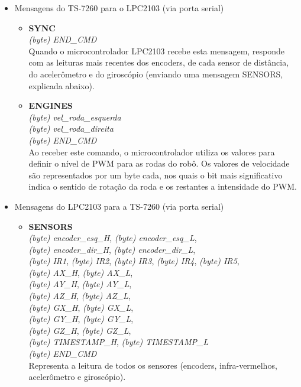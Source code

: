 \begin{itemize}
  \item Mensagens do TS-7260 para o LPC2103 (via porta serial)
  
	\begin{itemize}
		
	  \item \textbf{SYNC}\\
	  \textit{(byte) END\_CMD}\\
	  Quando o microcontrolador LPC2103 recebe esta mensagem, responde com as leituras mais recentes dos encoders, de cada sensor de distância, do acelerômetro e do giroscópio (enviando uma mensagem SENSORS, explicada abaixo).
	  
	  \item \textbf{ENGINES}\\
	  \textit{(byte) vel\_roda\_esquerda}\\
	  \textit{(byte) vel\_roda\_direita}\\
	  \textit{(byte) END\_CMD}\\
	  Ao receber este comando, o microcontrolador utiliza os valores para definir o nível de PWM para as rodas do robô. Os valores de velocidade são representados por um byte cada, nos quais o bit mais significativo indica o sentido de rotação da roda e os restantes a intensidade do PWM.
	  
	  \end{itemize}
	  
	  \item Mensagens do LPC2103 para a TS-7260 (via porta serial)
	  
	  \begin{itemize}
	  
	  \item \textbf{SENSORS}\\
	  \textit{(byte) encoder\_esq\_H}, \textit{(byte) encoder\_esq\_L},\\
	  \textit{(byte) encoder\_dir\_H}, \textit{(byte) encoder\_dir\_L},\\
	  \textit{(byte) IR1}, \textit{(byte) IR2}, \textit{(byte) IR3}, \textit{(byte) IR4}, \textit{(byte) IR5},\\
	  \textit{(byte) AX\_H}, \textit{(byte) AX\_L},\\
	  \textit{(byte) AY\_H}, \textit{(byte) AY\_L},\\
	  \textit{(byte) AZ\_H}, \textit{(byte) AZ\_L},\\
	  \textit{(byte) GX\_H}, \textit{(byte) GX\_L},\\
	  \textit{(byte) GY\_H}, \textit{(byte) GY\_L},\\
	  \textit{(byte) GZ\_H}, \textit{(byte) GZ\_L},\\
	  \textit{(byte) TIMESTAMP\_H}, \textit{(byte) TIMESTAMP\_L}\\
	  \textit{(byte) END\_CMD}\\
	  Representa a leitura de todos os sensores (encoders, infra-vermelhos, acelerômetro e giroscópio). 
	  

\end{itemize}
\end{itemize}
